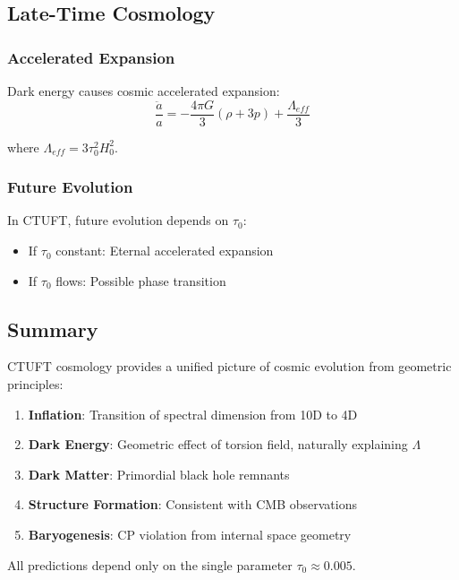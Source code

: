 \subsection{Late-Time Cosmology}

\subsubsection{Accelerated Expansion}

Dark energy causes cosmic accelerated expansion:
\begin{equation}
    \frac{\ddot{a}}{a} = -\frac{4\pi G}{3}(\rho + 3p) + \frac{\Lambda_{eff}}{3}
\end{equation}

where $\Lambda_{eff} = 3\tau_0^2 H_0^2$.

\subsubsection{Future Evolution}

In CTUFT, future evolution depends on $\tau_0$:
\begin{itemize}
    \item If $\tau_0$ constant: Eternal accelerated expansion
    \item If $\tau_0$ flows: Possible phase transition
\end{itemize}

\subsection{Summary}

CTUFT cosmology provides a unified picture of cosmic evolution from geometric principles:
\begin{enumerate}
    \item \textbf{Inflation}: Transition of spectral dimension from 10D to 4D
    \item \textbf{Dark Energy}: Geometric effect of torsion field, naturally explaining $\Lambda$
    \item \textbf{Dark Matter}: Primordial black hole remnants
    \item \textbf{Structure Formation}: Consistent with CMB observations
    \item \textbf{Baryogenesis}: CP violation from internal space geometry
\end{enumerate}

All predictions depend only on the single parameter $\tau_0 \approx 0.005$.
